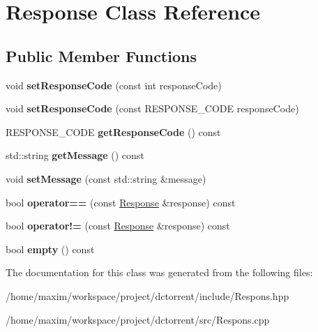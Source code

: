 \hypertarget{class_response}{}\section{Response Class Reference}
\label{class_response}
\subsection*{Public Member Functions}
\begin{DoxyCompactItemize}
\item 
\mbox{\label{class_response_a5027d8f799de6c3b363f346a0938ba24}} 
void {\bfseries set\+Response\+Code} (const int response\+Code)
\item 
\mbox{\label{class_response_a173e4ecbd97fc996f994cefd6a96151c}} 
void {\bfseries set\+Response\+Code} (const R\+E\+S\+P\+O\+N\+S\+E\+\_\+\+C\+O\+DE response\+Code)
\item 
\mbox{\label{class_response_a6c6264ecd2a5b3dd810088ab60454e06}} 
R\+E\+S\+P\+O\+N\+S\+E\+\_\+\+C\+O\+DE {\bfseries get\+Response\+Code} () const
\item 
\mbox{\label{class_response_a3c1d22536ecef18e21cc01fe10ad5703}} 
std\+::string {\bfseries get\+Message} () const
\item 
\mbox{\label{class_response_ad8851ad3fb70be26ba3454f4fa65f50a}} 
void {\bfseries set\+Message} (const std\+::string \&message)
\item 
\mbox{\label{class_response_a2370772ff85de1e6b7cea030a49af69a}} 
bool {\bfseries operator==} (const \hyperlink{class_response}{Response} \&response) const
\item 
\mbox{\label{class_response_a5a71397a64da703f9cfd4573397132d7}} 
bool {\bfseries operator!=} (const \hyperlink{class_response}{Response} \&response) const
\item 
\mbox{\label{class_response_aa77324541c1140d20c66174f37736ba7}} 
bool {\bfseries empty} () const
\end{DoxyCompactItemize}


The documentation for this class was generated from the following files\+:\begin{DoxyCompactItemize}
\item 
/home/maxim/workspace/project/dctorrent/include/Respons.\+hpp\item 
/home/maxim/workspace/project/dctorrent/src/Respons.\+cpp\end{DoxyCompactItemize}
